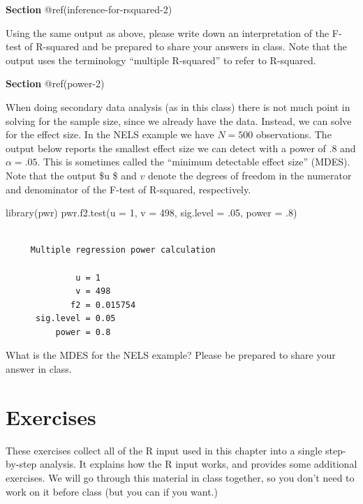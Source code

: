 \documentclass[
  letterpaper,
  DIV=11,
  numbers=noendperiod]{scrreprt}
\newenvironment{Shaded}{\begin{snugshade}}{\end{snugshade}}
\newcommand{\AttributeTok}[1]{\textcolor[rgb]{0.40,0.45,0.13}{#1}}
\newcommand{\DecValTok}[1]{\textcolor[rgb]{0.68,0.00,0.00}{#1}}
\newcommand{\FunctionTok}[1]{\textcolor[rgb]{0.28,0.35,0.67}{#1}}
\newcommand{\NormalTok}[1]{\textcolor[rgb]{0.00,0.23,0.31}{#1}}
\begin{document}
\textbf{Section} @ref(inference-for-rsquared-2)

Using the same output as above, please write down an interpretation of
the F-test of R-squared and be prepared to share your answers in class.
Note that the output uses the terminology ``multiple R-squared'' to
refer to R-squared.

\textbf{Section} @ref(power-2)

When doing secondary data analysis (as in this class) there is not much
point in solving for the sample size, since we already have the data.
Instead, we can solve for the effect size. In the NELS example we have
\(N=500\) observations. The output below reports the smallest effect
size we can detect with a power of .8 and \(\alpha = .05\). This is
sometimes called the ``minimum detectable effect size'' (MDES). Note
that the output \$u \$ and \(v\) denote the degrees of freedom in the
numerator and denominator of the F-test of R-squared, respectively.

\begin{Shaded}
\begin{Highlighting}[]
\FunctionTok{library}\NormalTok{(pwr)}
\FunctionTok{pwr.f2.test}\NormalTok{(}\AttributeTok{u =} \DecValTok{1}\NormalTok{, }\AttributeTok{v =} \DecValTok{498}\NormalTok{, }\AttributeTok{sig.level =}\NormalTok{ .}\DecValTok{05}\NormalTok{, }\AttributeTok{power =}\NormalTok{ .}\DecValTok{8}\NormalTok{)}
\end{Highlighting}
\end{Shaded}

\begin{verbatim}

     Multiple regression power calculation 

              u = 1
              v = 498
             f2 = 0.015754
      sig.level = 0.05
          power = 0.8
\end{verbatim}

What is the MDES for the NELS example? Please be prepared to share your
answer in class.

\hypertarget{exercises-2}{%
\section{Exercises}\label{exercises-2}}

These exercises collect all of the R input used in this chapter into a
single step-by-step analysis. It explains how the R input works, and
provides some additional exercises. We will go through this material in
class together, so you don't need to work on it before class (but you
can if you want.)
\end{document}
